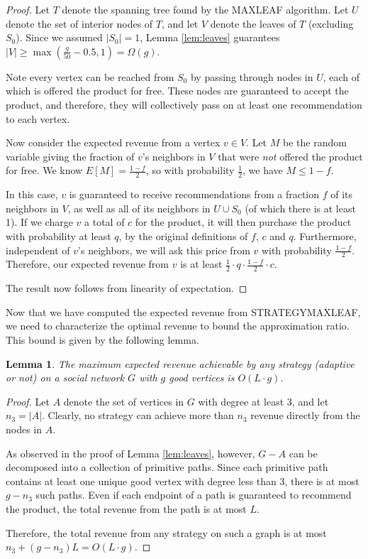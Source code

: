 \documentclass[letterpaper,twoside]{article}
\newtheorem{lemma}{Lemma}
\newcommand{\maxleaf}{\textrm{M{\scriptsize AX}\-L{\scriptsize EAF}}}
\newcommand{\strategyml}{\textrm{S{\scriptsize TRATEGY}\-M{\scriptsize AX}\-L{\scriptsize EAF}}}
\begin{document}
\begin{proof}
  Let $T$ denote the spanning tree found by the \maxleaf{}
  algorithm. Let $U$ denote the set of interior nodes of $T$, and
  let $V$ denote the leaves of $T$ (excluding $S_0$). Since we
  assumed $|S_0| = 1$, Lemma \ref{lem:leaves} guarantees $|V| \ge
  \max(\frac{g}{50} - 0.5, 1) = \Omega(g)$.

  Note every vertex can be reached from $S_0$ by passing through
  nodes in $U$, each of which is offered the product for free. These
  nodes are guaranteed to accept the product, and therefore, they
  will collectively pass on at least one recommendation to each vertex.

  Now consider the expected revenue from a vertex $v \in V$. Let $M$
  be the random variable giving the fraction of $v$'s neighbors in
  $V$ that were {\em not} offered the product for free. We know
  $E[M] = \frac{1-f}{2}$, so with probability $\frac{1}{2}$, we have
  $M \le 1-f$.

  In this case, $v$ is guaranteed to receive recommendations from a
  fraction $f$ of its neighbors in $V$, as well as all of its
  neighbors in $U \cup S_0$ (of which there is at least 1). If we
  charge $v$ a total of $c$ for the product, it will then purchase
  the product with probability at least $q$, by the original definitions
  of $f$, $c$ and $q$. Furthermore,
  independent of $v$'s neighbors, we will ask this price from $v$
  with probability $\frac{1-f}{2}$. Therefore, our expected revenue
  from $v$ is at least $\frac{1}{2} \cdot q \cdot \frac{1-f}{2}
  \cdot c$.

  The result now follows from linearity of expectation.
\end{proof}

Now that we have computed the expected revenue from \strategyml, we need to
characterize the optimal revenue to bound the approximation ratio. This bound
is given by the following lemma.
\begin{lemma} \label{lem:optbound}
The maximum expected revenue achievable by any strategy (adaptive or
not) on a social network $G$ with $g$ good vertices is $O(L
\cdot g)$.
\end{lemma}
\begin{proof}
  Let $A$ denote the set of vertices in $G$ with degree at least 3,
  and let $n_3 = |A|$. Clearly, no strategy can achieve more than
  $n_3$ revenue directly from the nodes in $A$.

  As observed in the proof of Lemma \ref{lem:leaves}, however,
  $G - A$ can be decomposed into a collection of primitive paths. Since
  each primitive path contains at least one unique good vertex with
  degree less than 3, there is at most $g - n_3$ such paths. Even if
  each endpoint of a path is guaranteed to recommend the product,
  the total revenue from the path is at most $L$.

  Therefore, the total revenue from any strategy on such a graph is at
  most $n_3 + (g - n_3)L = O(L \cdot g)$.
\end{proof}
\end{document}
